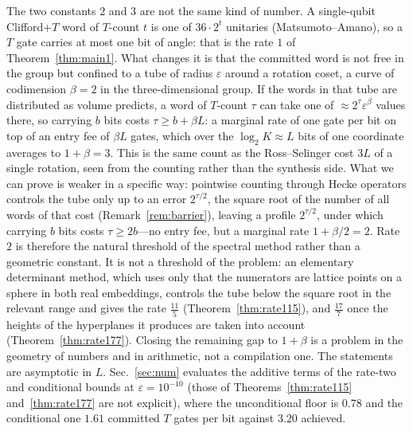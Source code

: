 \documentclass[aps,prx,twocolumn,superscriptaddress,nofootinbib,longbibliography]{revtex4-2}
\theoremstyle{plain}
\theoremstyle{definition}
\theoremstyle{remark}
\begin{document}
The two constants $2$ and $3$ are not the same kind of number. A single-qubit Clifford+$T$ word of $T$-count $t$ is one of $36\cdot2^t$ unitaries (Matsumoto--Amano), so a $T$ gate carries at most one bit of angle: that is the rate $1$ of Theorem~\ref{thm:main1}. What changes it is that the committed word is not free in the group but confined to a tube of radius $\varepsilon$ around a rotation coset, a curve of codimension $\beta=2$ in the three-dimensional group. If the words in that tube are distributed as volume predicts, a word of $T$-count $\tau$ can take one of $\approx2^{\tau}\varepsilon^{\beta}$ values there, so carrying $b$ bits costs $\tau\ge b+\beta L$: a marginal rate of one gate per bit on top of an entry fee of $\beta L$ gates, which over the $\log_2K\approx L$ bits of one coordinate averages to $1+\beta=3$. This is the same count as the Ross--Selinger cost $3L$ of a single rotation, seen from the counting rather than the synthesis side. What we can prove is weaker in a specific way: pointwise counting through Hecke operators controls the tube only up to an error $2^{\tau/2}$, the square root of the number of all words of that cost (Remark~\ref{rem:barrier}), leaving a profile $2^{\tau/2}$, under which carrying $b$ bits costs $\tau\ge2b$---no entry fee, but a marginal rate $1+\beta/2=2$. Rate $2$ is therefore the natural threshold of the spectral method rather than a geometric constant. It is not a threshold of the problem: an elementary determinant method, which uses only that the numerators are lattice points on a sphere in both real embeddings, controls the tube below the square root in the relevant range and gives the rate $\tfrac{11}5$ (Theorem~\ref{thm:rate115}), and $\tfrac{17}7$ once the heights of the hyperplanes it produces are taken into account (Theorem~\ref{thm:rate177}). Closing the remaining gap to $1+\beta$ is a problem in the geometry of numbers and in arithmetic, not a compilation one. The statements are asymptotic in $L$. Sec.~\ref{sec:num} evaluates the additive terms of the rate-two and conditional bounds at $\varepsilon=10^{-10}$ (those of Theorems~\ref{thm:rate115} and~\ref{thm:rate177} are not explicit), where the unconditional floor is $0.78$ and the conditional one $1.61$ committed $T$ gates per bit against $3.20$ achieved.
\end{document}
